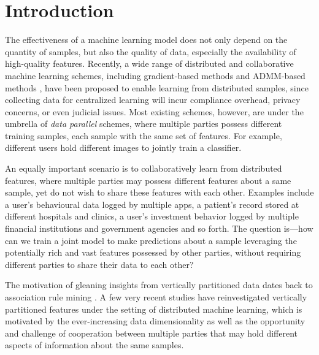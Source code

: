 \section{Introduction}



The effectiveness of a machine learning model does not only depend on the quantity of samples, but also the quality of data, especially the availability of high-quality features.
Recently, a wide range of distributed and collaborative machine learning schemes, including gradient-based methods \cite{li2014communication,ho2013more} and ADMM-based methods \cite{zhang2018improving,zhang2016dual,huang2018dp},
have been proposed to enable learning from distributed samples, since collecting data for centralized learning will incur compliance overhead, privacy concerns, or even judicial issues. Most existing schemes, however, are under the umbrella of \emph{data parallel} schemes, where multiple parties possess different training samples, each sample with the same set of features. 
For example, different users hold different images to jointly train a classifier.

An equally important scenario is to collaboratively learn from distributed features, where multiple parties may possess different features about a same sample, yet do not wish to share these features with each other. Examples include a user's behavioural data logged by multiple apps, a patient's record stored at different hospitals and clinics, a user's investment behavior logged by multiple financial institutions and government agencies and so forth. The question is---how can we train a joint model to make predictions about a sample leveraging the potentially rich and vast features possessed by other parties, without requiring different parties to share their data to each other?

The motivation of gleaning insights from vertically partitioned data dates back to association rule mining \cite{vaidya2002privacy,vaidya2003privacy}. A few very recent studies \cite{lou2018uplink,kenthapadi2013privacy,ying2018supervised,hu2019fdml,heinze2017preserving,dai2018privacy,bellet2015distributed} have reinvestigated vertically partitioned features under the setting of distributed machine learning, which is motivated by the ever-increasing data dimensionality as well as the opportunity and challenge of cooperation between multiple parties that may hold different aspects of information about the same samples. %

